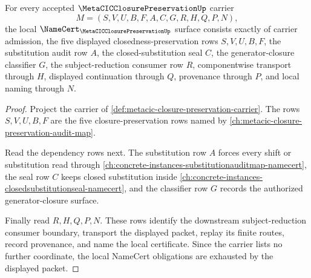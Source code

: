 \begin{theorem}
\label{thm:metacic-closure-preservation-namecert-obligations}
For every accepted $\MetaCICClosurePreservationUp$ carrier
$$
M=(S,V,U,B,F,A,C,G,R,H,Q,P,N),
$$
the local $\NameCert_{\MetaCICClosurePreservationUp}$ surface consists exactly of carrier admission, the five displayed closedness-preservation rows $S,V,U,B,F$, the substitution audit row $A$, the closed-substitution seal $C$, the generator-closure classifier $G$, the subject-reduction consumer row $R$, componentwise transport through $H$, displayed continuation through $Q$, provenance through $P$, and local naming through $N$.
\end{theorem}
\begin{proof}
Project the carrier of \autoref{def:metacic-closure-preservation-carrier}. The rows $S,V,U,B,F$ are the five closure-preservation rows named by \autoref{ch:metacic-closure-preservation-audit-map}.

Read the dependency rows next. The substitution row $A$ forces every shift or substitution read through \autoref{ch:concrete-instances-substitutionauditmap-namecert}, the seal row $C$ keeps closed substitution inside \autoref{ch:concrete-instances-closedsubstitutionseal-namecert}, and the classifier row $G$ records the authorized generator-closure surface.

Finally read $R,H,Q,P,N$. These rows identify the downstream subject-reduction consumer boundary, transport the displayed packet, replay its finite routes, record provenance, and name the local certificate. Since the carrier lists no further coordinate, the local NameCert obligations are exhausted by the displayed packet.
\end{proof}

